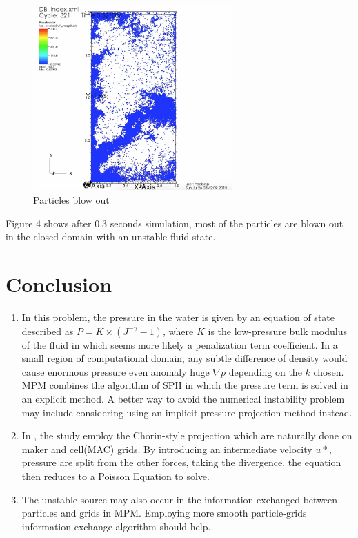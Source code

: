 \documentclass[a4paper, 11pt]{article}
\begin{document}
\begin{figure}[H]
	\centering
	\includegraphics[width=3.0in]{images/3}
	\caption{Particles blow out}
\end{figure}
Figure 4 shows after 0.3 seconds simulation, most of the particles are blown out in the closed domain with an unstable fluid state.

\section{Conclusion}
\begin{enumerate}
	\item In this problem, the pressure in the water is given by an equation of state described as $P=K\times(J^{-\gamma} - 1)$, where $K$ is the low-pressure bulk modulus of the fluid in which seems more likely a penalization term coefficient. In a small region of computational domain, any subtle difference of density would cause enormous pressure even anomaly huge $\nabla{p}$ depending on the $k$ chosen. MPM\cite{sulsky1994particle}\cite{nguyenmaterial} combines the algorithm of SPH\cite{muller2003particle} in which the pressure term is solved in an explicit method. A better way to avoid the numerical instability problem may include considering using an implicit pressure projection method instead.
	\item In \cite{stomakhin2014augmented}, the study employ the Chorin-style projection which are naturally done on maker and cell(MAC) grids. By introducing an intermediate velocity $u*$, pressure are split from the other forces, taking the divergence, the equation then reduces to a Poisson Equation to solve.
	\item The unstable source may also occur in the information exchanged between particles and grids in MPM. Employing more smooth particle-grids information exchange algorithm should help.
\end{enumerate}


\nocite{*}

\end{document}
